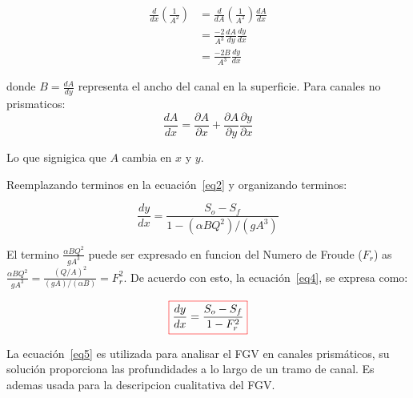 \documentclass[11pt, oneside]{article}
\begin{document}
\begin{equation}
\begin{split}
    \frac{d}{dx}\left( \frac{1}{A^2}\right) & = \frac{d}{dA}\left( \frac{1}{A^2}\right) \frac{dA}{dx} \\
                                            & = \frac{-2}{A^3} \frac{dA}{dy} \frac{dy}{dx} \\
                                            & = \frac{-2B}{A^3}  \frac{dy}{dx}
\end{split}
\label{eq3}
\end{equation}

donde $B = \frac{dA}{dy}$ representa el ancho del canal en la superficie. Para canales no prismaticos:
$$
\frac{dA}{dx} = \frac{\partial A}{\partial x} + \frac{\partial A}{\partial y} \frac{\partial y}{\partial x}
$$

Lo que signigica que $A$ cambia en $x$ y $y$. 

Reemplazando terminos en la ecuaci\'on~\ref{eq2} y organizando terminos:

\begin{equation}
    \frac{dy}{dx} = \frac{S_o - S_f }{1-\left(\alpha B Q^2 \right) /\left(g A^3 \right)}
\label{eq4}
\end{equation}

El termino $\frac{\alpha B Q^2 }{g A^3} $ puede ser expresado en funcion del Numero de Froude ($F_r$) as $\frac{\alpha B Q^2 }{g A^3}  = \frac{\left(Q/A \right)^2}{\left( gA \right)/\left( \alpha B \right) } = F_r^2 $. De acuerdo con esto, la ecuaci\'on~\ref{eq4}, se expresa como:

\begin{equation}
    \color{red}\boxed{\color{black}   \frac{dy}{dx} = \frac{S_o - S_f }{1-F_r^2}}
\label{eq5}
\end{equation}

La ecuaci\'on~\ref{eq5} es utilizada para analisar el FGV en canales prism\'aticos, su soluci\'on proporciona las profundidades a lo largo de un tramo de canal. Es ademas usada para la descripcion cualitativa del FGV. 
\end{document}
